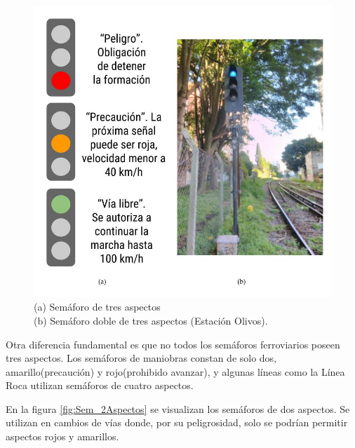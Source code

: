 			 \begin{figure}[htbp!]
				\centering
				\includegraphics[scale=.35]{./Figures/Sem3}
				\caption{(a) Semáforo de tres aspectos\\(b) Semáforo doble de tres aspectos (Estación Olivos).}
				\label{fig:Sem_3Aspectos}
			\end{figure}
			
			Otra diferencia fundamental es que no todos los semáforos ferroviarios poseen tres aspectos. Los semáforos de maniobras constan de solo dos, amarillo(precaución) y rojo(prohibido avanzar), y algunas líneas como la Línea Roca utilizan semáforos de cuatro aspectos.	
			
			En la figura \ref{fig:Sem_2Aspectos} se visualizan los semáforos de dos aspectos. Se utilizan en cambios de vías donde, por su peligrosidad, solo se podrían permitir aspectos rojos y amarillos.
			 
